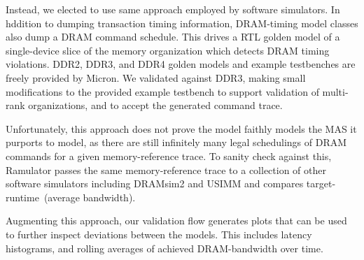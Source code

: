 Instead, we elected to use same approach employed by software simulators. In
hddition to dumping transaction timing information, DRAM-timing model classes
also dump a DRAM command schedule. This drives a RTL golden model of a
single-device slice of the memory organization which detects DRAM timing
violations. DDR2, DDR3, and DDR4 golden models and example testbenches are
freely provided by Micron\cite{microngolden}. We validated against DDR3, making small
modifications to the provided example testbench to support validation of
multi-rank organizations, and to accept the generated command trace.

Unfortunately, this approach does not prove the model faithly models the MAS it
purports to model, as there are still infinitely many legal schedulings of DRAM
commands for a given memory-reference trace. To sanity check against this,
Ramulator passes the same memory-reference trace to a collection of other
software simulators including DRAMsim2 and USIMM and compares
target-runtime~(average bandwidth).

Augmenting this approach, our validation flow generates plots that can be used
to further inspect deviations between the models. This includes latency
histograms, and rolling averages of achieved DRAM-bandwidth over time.
